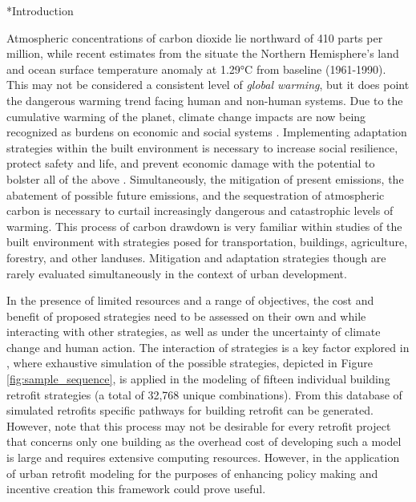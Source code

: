 \documentclass[twocolumn, a4paper,10pt]{article}
\makeatletter
\renewcommand\section{\@startsection{section}{1}{\z@}{3pt}{3pt}{\normalfont\large\bfseries}}
\makeatother
\begin{document}
\section*{Introduction}

Atmospheric concentrations of carbon dioxide lie northward of 410 parts per million, while recent estimates from the \citet{} situate the Northern Hemisphere’s land and ocean surface temperature anomaly at 1.29°C from baseline (1961-1990). This may not be considered a consistent level of \textit{global warming}, but it does point the dangerous warming trend facing human and non-human systems. Due to the cumulative warming of the planet, climate change impacts are now being recognized as burdens on economic and social systems \citep{frame_climate_2020,frame_economic_2020}. Implementing adaptation strategies within the built environment is necessary to increase social resilience, protect safety and life, and prevent economic damage with the potential to bolster all of the above \citep{schunemann_mitigation_2020}. Simultaneously, the mitigation of present emissions, the abatement of possible future emissions, and the sequestration of atmospheric carbon is necessary to curtail increasingly dangerous and catastrophic levels of warming. This process of carbon drawdown is very familiar within studies of the built environment with strategies posed for transportation, buildings, agriculture, forestry, and other landuses. Mitigation and adaptation strategies though are rarely evaluated simultaneously in the context of urban development.

In the presence of limited resources and a range of objectives, the cost and benefit of proposed strategies need to be assessed on their own and while interacting with other strategies, as well as under the uncertainty of climate change and human action. The interaction of strategies is a key factor explored in \citet{rysanek_using_2013}, where exhaustive simulation of the possible strategies, depicted in Figure \ref{fig:sample_sequence}, is applied in the modeling of fifteen individual building retrofit strategies (a total of 32,768 unique combinations). From this database of simulated retrofits specific pathways for building retrofit can be generated. However, \citet{rysanek_using_2013} note that this process may not be desirable for every retrofit project that concerns only one building as the overhead cost of developing such a model is large and requires extensive computing resources. However, in the application of urban retrofit modeling for the purposes of enhancing policy making and incentive creation this framework could prove useful.
\end{document}
